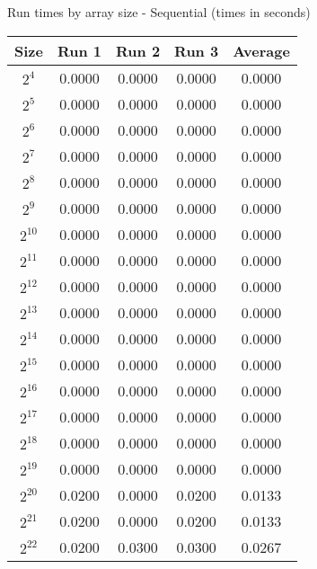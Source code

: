 \centering
\caption{Run times by array size - Sequential (times in seconds)}
\begin{tabular}{@{} c c c c c @{}}
\toprule
    \textbf{Size} & \textbf{Run 1}& \textbf{Run 2}& \textbf{Run 3}& \textbf{Average}\\
\midrule
    $2^4$ & 0.0000 & 0.0000 & 0.0000 & 0.0000\\
\lightrule
    $2^5$ & 0.0000 & 0.0000 & 0.0000 & 0.0000\\
\lightrule
    $2^6$ & 0.0000 & 0.0000 & 0.0000 & 0.0000\\
\lightrule
    $2^7$ & 0.0000 & 0.0000 & 0.0000 & 0.0000\\
\lightrule
    $2^8$ & 0.0000 & 0.0000 & 0.0000 & 0.0000\\
\lightrule
    $2^9$ & 0.0000 & 0.0000 & 0.0000 & 0.0000\\
\lightrule
    $2^{10}$ & 0.0000 & 0.0000 & 0.0000 & 0.0000\\
\lightrule
    $2^{11}$ & 0.0000 & 0.0000 & 0.0000 & 0.0000\\
\lightrule
    $2^{12}$ & 0.0000 & 0.0000 & 0.0000 & 0.0000\\
\lightrule
    $2^{13}$ & 0.0000 & 0.0000 & 0.0000 & 0.0000\\
\lightrule
    $2^{14}$ & 0.0000 & 0.0000 & 0.0000 & 0.0000\\
\lightrule
    $2^{15}$ & 0.0000 & 0.0000 & 0.0000 & 0.0000\\
\lightrule
    $2^{16}$ & 0.0000 & 0.0000 & 0.0000 & 0.0000\\
\lightrule
    $2^{17}$ & 0.0000 & 0.0000 & 0.0000 & 0.0000\\
\lightrule
    $2^{18}$ & 0.0000 & 0.0000 & 0.0000 & 0.0000\\
\lightrule
    $2^{19}$ & 0.0000 & 0.0000 & 0.0000 & 0.0000\\
\lightrule
    $2^{20}$ & 0.0200 & 0.0000 & 0.0200 & 0.0133\\
\lightrule
    $2^{21}$ & 0.0200 & 0.0000 & 0.0200 & 0.0133\\
\lightrule
    $2^{22}$ & 0.0200 & 0.0300 & 0.0300 & 0.0267\\
\bottomrule
\end{tabular}
\label{table:array_seq_cluster}
